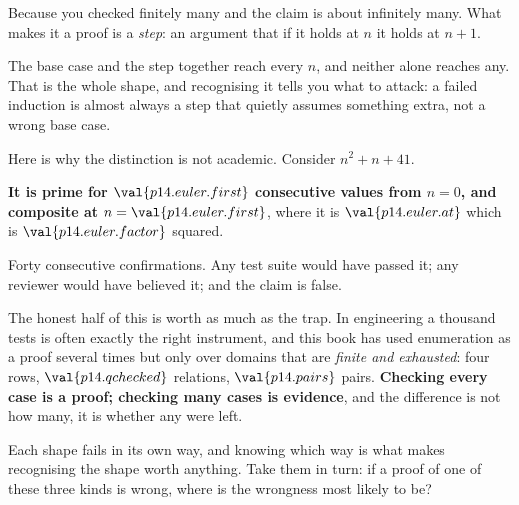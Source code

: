 \begin{fr}
\begin{ansblock}
Because you checked finitely many and the claim is about infinitely many. What
makes it a proof is a \emph{step}: an argument that if it holds at $n$ it
holds at $n+1$.
\end{ansblock}

The base case and the step together reach every $n$, and neither alone reaches
any. That is the whole shape, and recognising it tells you what to attack: a
failed induction is almost always a step that quietly assumes something
extra, not a wrong base case.

Here is why the distinction is not academic. Consider $n^{2} + n + 41$.


\begin{trapbox}
\textbf{It is prime for $\val{p14.euler.first}$ consecutive values from
$n = 0$, and composite at $n = \val{p14.euler.first}$}, where it is
$\val{p14.euler.at}$ \dash{} which is $\val{p14.euler.factor}$ squared.

Forty consecutive confirmations. Any test suite would have passed it; any
reviewer would have believed it; and the claim is false.

The honest half of this is worth as much as the trap. In engineering a
thousand tests is often exactly the right instrument, and this book has used
enumeration as a proof several times \dash{} but only over domains that are
\emph{finite and exhausted}: four rows, $\val{p14.qchecked}$ relations,
$\val{p14.pairs}$ pairs. \textbf{Checking every case is a proof; checking many
cases is evidence}, and the difference is not how many, it is whether any were
left.
\end{trapbox}
\end{fr}

\begin{fr}
Each shape fails in its own way, and knowing which way is what makes
recognising the shape worth anything. Take them in turn: if a proof of one of
these three kinds is wrong, where is the wrongness most likely to be?
\dotline
\nextframe
\end{fr}

